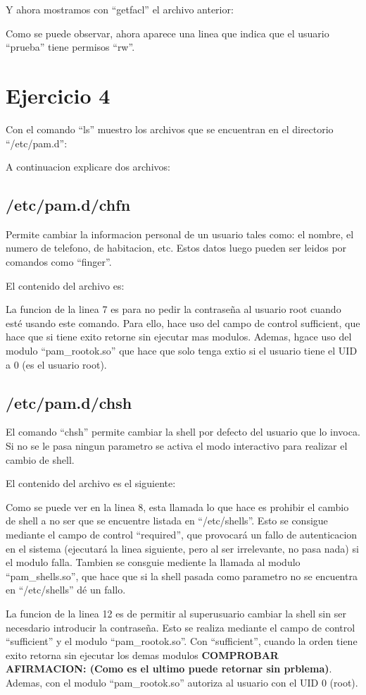 \documentclass{article}
\begin{document}


Y ahora mostramos con ``getfacl'' el archivo anterior:


Como se puede observar, ahora aparece una linea que indica que el usuario ``prueba'' tiene permisos ``rw''.


\section{Ejercicio 4}
Con el comando ``ls'' muestro los archivos que se encuentran en el directorio ``/etc/pam.d'':


A continuacion explicare dos archivos:

\subsection{/etc/pam.d/chfn}
Permite cambiar la informacion personal de un usuario tales como: el nombre, el numero de telefono, de habitacion, etc. Estos datos luego pueden ser leidos por comandos como ``finger''.

El contenido del archivo es:


La funcion de la linea 7 es para no pedir la contraseña al usuario root cuando esté usando este comando. Para ello, hace uso del campo de control sufficient, que hace que si tiene exito retorne sin ejecutar mas modulos. Ademas, hgace uso del modulo ``pam\_rootok.so'' que hace que solo tenga extio si el usuario tiene el UID a 0 (es el usuario root).

\subsection{/etc/pam.d/chsh}
El comando ``chsh'' permite cambiar la shell por defecto del usuario que lo invoca. Si no se le pasa ningun parametro se activa el modo interactivo para realizar el cambio de shell.

El contenido del archivo es el siguiente:



Como se puede ver en la linea 8, esta llamada lo que hace es prohibir el cambio de shell a no ser que se encuentre listada en ``/etc/shells''. Esto se consigue mediante el campo de control ``required'', que provocará un fallo de autenticacion en el sistema (ejecutará la linea siguiente, pero al ser irrelevante, no pasa nada) si el modulo falla. Tambien se consguie mediente la llamada al modulo ``pam\_shells.so'', que hace que si la shell pasada como parametro no se encuentra en ``/etc/shells'' dé un fallo.

La funcion de la linea 12 es de permitir al superusuario cambiar la shell sin ser necesdario introducir la contraseña. Esto se realiza mediante el campo de control ``sufficient'' y el modulo ``pam\_rootok.so''. Con ``sufficient'', cuando la orden tiene exito retorna sin ejecutar los demas modulos \textbf{COMPROBAR AFIRMACION: (Como es el ultimo puede retornar sin prblema)}. Ademas, con el modulo ``pam\_rootok.so'' autoriza al usuario con el UID 0 (root).
\end{document}
